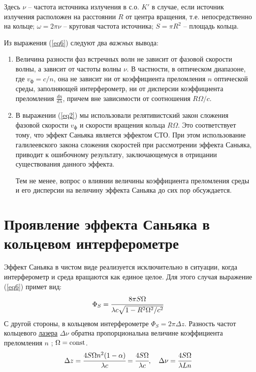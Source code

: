 \documentclass[a4paper, 12pt, openany]{book}
\begin{document}
	Здесь $\nu$ -- частота источника излучения в с.о. $K'$ в случае, если источник излучения расположен на расстоянии $R$ от центра вращения, т.е. непосредственно на кольце; $\omega = 2 \pi \nu$ -- круговая частота источника; $S = \pi R^2$ -- площадь кольца.
	
	Из выражения (\ref{eq6}) следуют два \textit{важных} вывода:
	\begin{enumerate}
		\item Величина разности фаз встречных волн не зависит от фазовой скорости волны, а зависит от частоты волны $\nu$. В частности, в оптическом диапазоне, где $v_\text{ф} = c / n$, она не зависит ни от коэффициента преломления $n$ оптической среды, заполняющей интерферометр, ни от дисперсии коэффициента преломления $\frac{dn}{d\lambda}$, причем вне зависимости от соотношения $R \Omega / c$.
		\item В выражении (\ref{eq2}) мы использовали релятивистский закон сложения фазовой скорости $v_\text{ф}$ и скорости вращения кольца $R \Omega$. Это соответствует тому, что эффект Саньяка является эффектом СТО. При этом использование галилеевского закона сложения скоростей при рассмотрении эффекта Саньяка, приводит к ошибочному результату, заключающемуся в отрицании существования данного эффекта.
		
	Тем не менее, вопрос о влиянии величины	коэффициента преломления среды и его дисперсии на величину эффекта Саньяка до сих пор обсуждается.
	\end{enumerate}
	
	\section{Проявление эффекта Саньяка в кольцевом интерферометре}
	Эффект Саньяка в чистом виде реализуется исключительно в ситуации, когда интерферометр и среда вращаются как единое целое. Для этого случая выражение (\ref{eq6}) примет вид:
	\begin{equation}
	\label{eq7}
	\Phi_S = \cfrac{8 \pi S \Omega}{\lambda c \sqrt{1 - R^2 \Omega^2 / c^2}}
	\end{equation}
	С другой стороны, в кольцевом интерферометре $\Phi_S = 2 \pi \Delta z$. Разность частот кольцевого \underline{лазера} $\Delta \nu$ обратна пропорциональна величине коэффициента преломления $n$ \cite{litlink5}; $\Omega = \operatorname{\mathop{const}}$.
	\begin{equation}
	\label{eq8}
	\Delta z = \cfrac{4 S \Omega n^2 (1- \alpha)}{\lambda c} = \cfrac{4 S \Omega}{\lambda c}, \ \ \  \Delta \nu = \cfrac{4 S \Omega}{\lambda L n}
	\end{equation}
	
\end{document}
